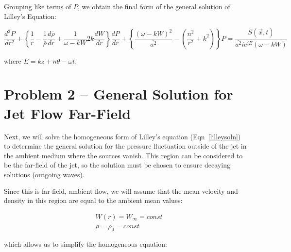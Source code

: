\documentclass[]{aiaa-tc}%
\begin{document}
Grouping like terms of $P$, we obtain the final form of the general solution of Lilley's Equation:

\begin{equation} \label{lilleysoln}
\boxed{
\dfrac{d^2P}{dr^2}
+ \left\{
    \dfrac{1}{r}
    - \dfrac{1}{\overline{\rho}}\frac{d \overline{\rho}}{dr}
    + \dfrac{1}{\omega - kW} 2k \dfrac{dW}{dr}
\right\} \dfrac{dP}{dr}
+ \left\{
    \dfrac{(\omega - kW)^2}{\overline{a^2}}
    - \left( \dfrac{n^2}{r^2} + k^2 \right)
\right\} P
= \dfrac{S(\vec{x}, t)}{\overline{a^2} ie^{iE} (\omega - kW)} }
\end{equation}

\noindent where $E=kz + n\theta -\omega t$.





\section{Problem 2 -- General Solution for Jet Flow Far-Field} %

Next, we will solve the homogeneous form of Lilley's equation (Eqn~\ref{lilleysoln}) to determine the general solution for the pressure fluctuation outside of the jet in the ambient medium where the sources vanish.  This region can be considered to be the far-field of the jet, so the solution must be chosen to ensure decaying solutions (outgoing waves).

Since this is far-field, ambient flow, we will assume that the mean velocity and density in this region are equal to the ambient mean values:

\begin{equation}
\begin{split}
&W(r)= W_{\infty}=const \\
&\overline{\rho} = \overline{\rho_0} = const
\end{split}
\end{equation}

\noindent which allows us to simplify the homogeneous equation:
\end{document}
